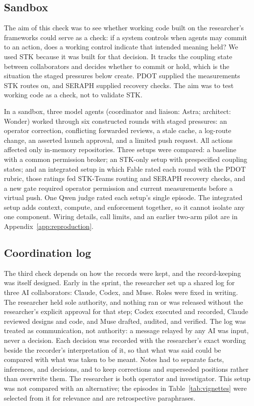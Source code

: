 \documentclass[11pt]{article}
\begin{document}
\subsection{Sandbox}
The aim of this check was to see whether working code built on the researcher's frameworks could serve as a check: if a system controls when agents may commit to an action, does a working control indicate that intended meaning held? We used STK because it was built for that decision. It tracks the coupling state between collaborators and decides whether to commit or hold, which is the situation the staged pressures below create. PDOT supplied the measurements STK routes on, and SERAPH supplied recovery checks. The aim was to test working code as a check, not to validate STK.

In a sandbox, three model agents (coordinator and liaison: Astra; architect: Wonder) worked through six constructed rounds with staged pressures: an operator correction, conflicting forwarded reviews, a stale cache, a log-route change, an asserted launch approval, and a limited push request. All actions affected only in-memory repositories. Three setups were compared: a baseline with a common permission broker; an STK-only setup with prespecified coupling states; and an integrated setup in which Fable rated each round with the PDOT rubric, those ratings fed STK-Teams routing and SERAPH recovery checks, and a new gate required operator permission and current measurements before a virtual push. One Qwen judge rated each setup's single episode. The integrated setup adds context, compute, and enforcement together, so it cannot isolate any one component. Wiring details, call limits, and an earlier two-arm pilot are in Appendix~\ref{app:reproduction}.

\subsection{Coordination log}
The third check depends on how the records were kept, and the record-keeping was itself designed. Early in the sprint, the researcher set up a shared log for three AI collaborators: Claude, Codex, and Muse. Roles were fixed in writing. The researcher held sole authority, and nothing ran or was released without the researcher's explicit approval for that step; Codex executed and recorded, Claude reviewed designs and code, and Muse drafted, audited, and verified. The log was treated as communication, not authority: a message relayed by any AI was input, never a decision. Each decision was recorded with the researcher's exact wording beside the recorder's interpretation of it, so that what was said could be compared with what was taken to be meant. Notes had to separate facts, inferences, and decisions, and to keep corrections and superseded positions rather than overwrite them. The researcher is both operator and investigator. This setup was not compared with an alternative; the episodes in Table~\ref{tab:vignettes} were selected from it for relevance and are retrospective paraphrases.
\end{document}
